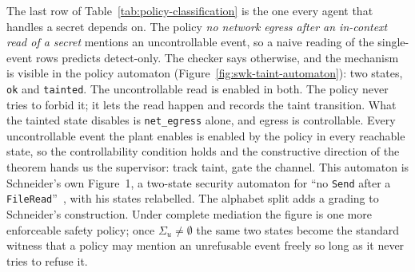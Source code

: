 \documentclass[11pt,a4paper]{article}
\theoremstyle{definition}
\theoremstyle{remark}
\begin{document}
The last row of Table~\ref{tab:policy-classification} is the one every agent that
handles a secret depends on. The policy \emph{no network egress after an in-context read of a secret} mentions an
uncontrollable event, so a naive reading of the single-event rows predicts detect-only. The
checker says otherwise, and the mechanism is visible in the policy automaton
(Figure~\ref{fig:swk-taint-automaton}): two states,
\texttt{ok} and \texttt{tainted}. The uncontrollable read is enabled in both. The policy never
tries to forbid it; it lets the read happen and records the taint transition. What the
tainted state disables is \texttt{net\_egress} alone, and egress is controllable. Every
uncontrollable event the plant enables is enabled by the policy in every reachable state, so
the controllability condition holds and the constructive direction of the theorem hands us the supervisor:
track taint, gate the channel. This automaton is Schneider's own Figure~1, a two-state
security automaton for ``no \texttt{Send} after a \texttt{FileRead}''~,
with his states relabelled. The alphabet split adds a grading to Schneider's
construction. Under complete mediation the figure is one more enforceable safety policy;
once $\Sigma_u \neq \emptyset$ the same two states become the standard witness that a policy may
mention an unrefusable event freely so long as it never tries to refuse it.


\end{document}
